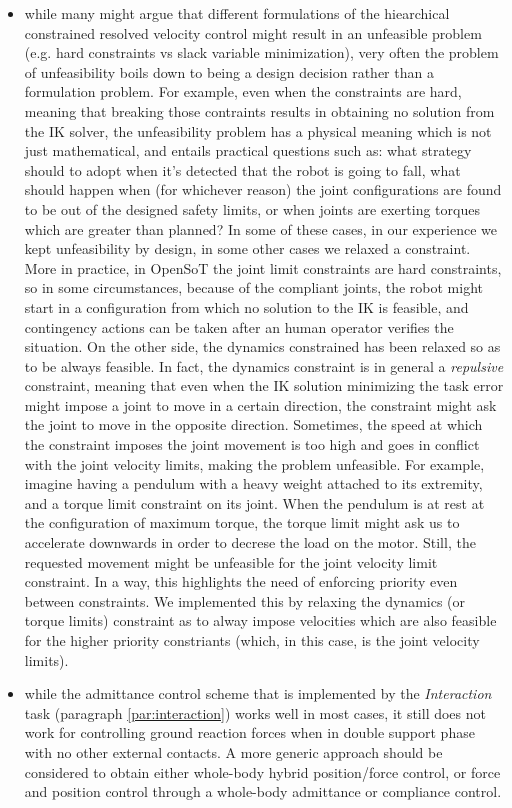 \documentclass[%
	paper=A4,					%
	twoside=true,				%
	openright,			.
	parskip=full,				%
	chapterprefix=true,			%
	11pt,						%
	headings=normal,			%
	bibliography=totoc,			%
	listof=totoc,				%
	titlepage=on,				%
	captions=tableabove,		%
	draft=false,				%
]{scrreprt}%
\begin{document}
\begin{itemize}
 \item while many might argue that different formulations of the hiearchical constrained resolved velocity control might result in an unfeasible problem (e.g. hard constraints vs slack variable minimization), very often the problem  of unfeasibility boils down to being a design decision rather than a formulation problem. For example, even when the constraints are hard, meaning that breaking those contraints results in obtaining no solution from the IK solver, the unfeasibility problem has a physical meaning which is not just mathematical, and entails practical questions such as: what strategy should to adopt when it's detected that the robot is going to fall, what should happen when (for whichever reason) the joint configurations are found to be out of the designed safety limits, or when joints are exerting torques which are greater than planned? In some of these cases, in our experience we kept unfeasibility by design, in some other cases we relaxed a constraint. More in practice, in OpenSoT the joint limit constraints are hard constraints, so in some circumstances, because of the compliant joints, the robot might start in a configuration from which no solution to the IK is feasible, and contingency actions can be taken after an human operator verifies the situation. On the other side, the dynamics constrained has been relaxed so as to be always feasible. In fact, the dynamics constraint is in general a \emph{repulsive} constraint, meaning that even when the IK solution minimizing the task error might impose a joint to move in a certain direction, the constraint might ask the joint to move in the opposite direction. Sometimes, the speed at which the constraint imposes the joint movement is too high and goes in conflict with the joint velocity limits, making the problem unfeasible. For example, imagine having a pendulum with a heavy weight attached to its extremity, and a torque limit constraint on its joint. When the pendulum is at rest at the configuration of maximum torque, the torque limit might ask us to accelerate downwards in order to decrese the load on the motor. Still, the requested movement might be unfeasible for the joint velocity limit constraint. In a way, this highlights the need of enforcing priority even between constraints. We implemented this by relaxing the dynamics (or torque limits) constraint as to alway impose velocities which are also feasible for the higher priority constriants (which, in this case, is the joint velocity limits).
 \item while the admittance control scheme that is implemented by the \emph{Interaction} task (paragraph \ref{par:interaction}) works well in most cases, it still does not work for controlling ground reaction forces when in double support phase with no other external contacts. A more generic approach should be considered to obtain either whole-body hybrid position/force control, or force and position control through a whole-body admittance or compliance control.

\end{itemize}
\end{document}
